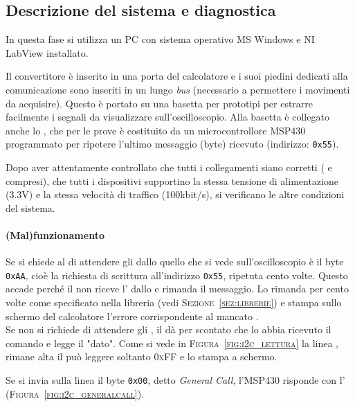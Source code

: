 \subsection{Descrizione del sistema e diagnostica}
In questa fase si utilizza un {PC}
con sistema operativo MS Windows e NI LabView installato.

Il convertitore è inserito in una porta {\usb} del calcolatore
e i suoi piedini dedicati alla comunicazione {\iic} sono inseriti
in un lungo \textit{bus} (necessario a permettere i movimenti da acquisire).
Questo è portato su una basetta per prototipi
per estrarre facilmente i segnali da visualizzare sull'oscilloscopio.
Alla basetta è collegato anche lo {\slave}, che per le prove
è costituito da un microcontrollore {MSP430}
programmato per ripetere l'ultimo messaggio (byte) ricevuto
(indirizzo: \texttt{0x55}).

Dopo aver attentamente controllato che tutti i collegamenti siano corretti
({\sda} e {\scl} compresi),
che tutti i dispositivi supportino la stessa tensione di alimentazione (3.3V)
e la stessa velocità di traffico (100kbit/s),
si verificano le altre condizioni del sistema.\\

\paragraph{(Mal)funzionamento}
Se si chiede al {\master} di attendere gli {\Ack} dallo {\slave}
quello che si vede sull'oscilloscopio è
il byte \texttt{0xAA}, cioè
la richiesta di scrittura all'indirizzo \texttt{0x55},
ripetuta cento volte. Questo accade perché il {\master}
non riceve l'{\ack} dallo {\slave} e rimanda il messaggio.
Lo rimanda per cento volte come specificato nella libreria
(vedi \textsc{Sezione~\ref{sez:librerie}}) e stampa sullo schermo del calcolatore
l'errore corrispondente al mancato {\Ack}.\\

Se non si richiede di attendere gli {\ack},
il \master{} dà per scontato che lo \slave{} abbia ricevuto il comando
e legge il "dato". Come si vede in \textsc{Figura~\ref{fig:i2c_lettura}}
la linea \sda{}, rimane alta il \master{} può leggere soltanto \textsc{0xFF}
e lo stampa a schermo.

Se si invia sulla linea il byte \texttt{0x00}, detto \textit{General Call},
 l'{MSP430} risponde con l'{\ack}
 (\textsc{Figura~\ref{fig:i2c_generalcall}}).

